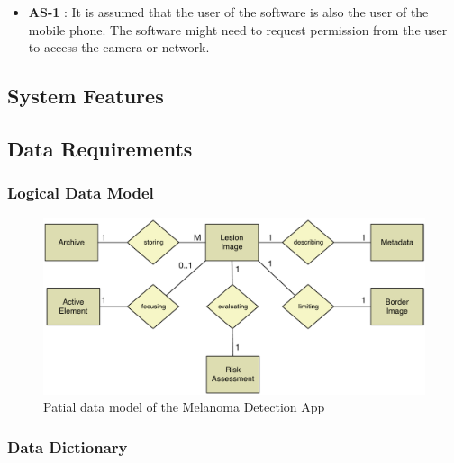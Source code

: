                     \noindent
                    \begin{itemize}[leftmargin=*]
                        \item[]  \textbf{AS-1} : It is assumed that the user of the software is also the user of the mobile phone. The software might need to request permission from the user to access the camera or network.

                    \end{itemize}


    \subsection{System Features}
        

    \subsection{Data Requirements}
        \subsubsection{Logical Data Model}

            \begin{figure}[H]
                \centering
                \includegraphics[width=\textwidth]{assets/requirements/EntRel.pdf}
                \caption{Patial data model of the Melanoma Detection App}
                \label{fig:partial_feature_tree}
            \end{figure}


        \subsubsection{Data Dictionary}

